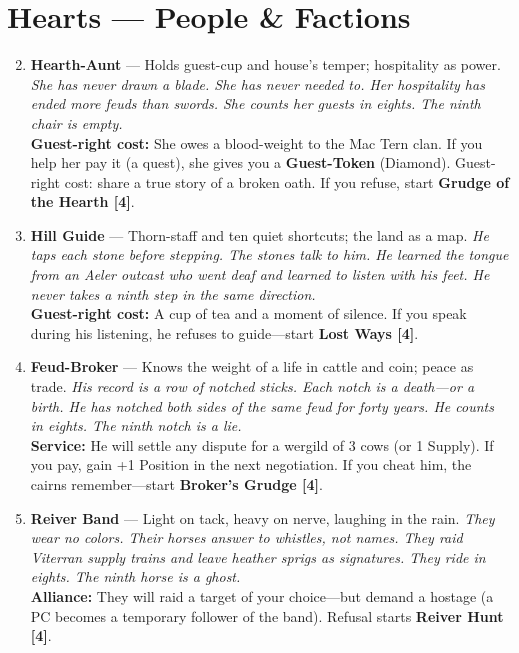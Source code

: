 \section{Hearts --- People \& Factions}
\label{sec:ubral-people}
\begin{enumerate}
\setcounter{enumi}{1}
\item \textbf{Hearth-Aunt} --- Holds guest-cup and house's temper; hospitality as power.
  \hfill \textit{She has never drawn a blade. She has never needed to. Her hospitality has ended more feuds than swords. She counts her guests in eights. The ninth chair is empty.} \\
  \textbf{Guest-right cost:} She owes a blood-weight to the Mac Tern clan. If you help her pay it (a quest), she gives you a \textbf{Guest-Token} (Diamond). Guest-right cost: share a true story of a broken oath. If you refuse, start \textbf{Grudge of the Hearth [4]}.

\item \textbf{Hill Guide} --- Thorn-staff and ten quiet shortcuts; the land as a map.
  \hfill \textit{He taps each stone before stepping. The stones talk to him. He learned the tongue from an Aeler outcast who went deaf and learned to listen with his feet. He never takes a ninth step in the same direction.} \\
  \textbf{Guest-right cost:} A cup of tea and a moment of silence. If you speak during his listening, he refuses to guide---start \textbf{Lost Ways [4]}.

\item \textbf{Feud-Broker} --- Knows the weight of a life in cattle and coin; peace as trade.
  \hfill \textit{His record is a row of notched sticks. Each notch is a death---or a birth. He has notched both sides of the same feud for forty years. He counts in eights. The ninth notch is a lie.} \\
  \textbf{Service:} He will settle any dispute for a wergild of 3 cows (or 1 Supply). If you pay, gain +1 Position in the next negotiation. If you cheat him, the cairns remember---start \textbf{Broker's Grudge [4]}.

\item \textbf{Reiver Band} --- Light on tack, heavy on nerve, laughing in the rain.
  \hfill \textit{They wear no colors. Their horses answer to whistles, not names. They raid Viterran supply trains and leave heather sprigs as signatures. They ride in eights. The ninth horse is a ghost.} \\
  \textbf{Alliance:} They will raid a target of your choice---but demand a hostage (a PC becomes a temporary follower of the band). Refusal starts \textbf{Reiver Hunt [4]}.


\end{enumerate}
